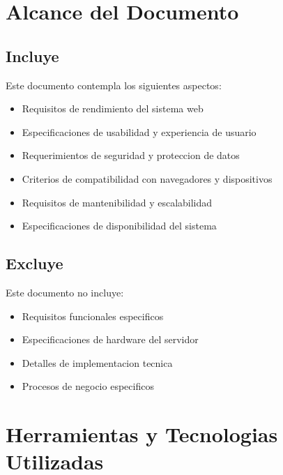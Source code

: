 \documentclass[12pt, a4paper]{article}
\begin{document}
\section{Alcance del Documento}

\subsection{Incluye}

\hspace{1.27cm}Este documento contempla los siguientes aspectos:

\begin{itemize}
    \item Requisitos de rendimiento del sistema web
    \item Especificaciones de usabilidad y experiencia de usuario
    \item Requerimientos de seguridad y proteccion de datos
    \item Criterios de compatibilidad con navegadores y dispositivos
    \item Requisitos de mantenibilidad y escalabilidad
    \item Especificaciones de disponibilidad del sistema
\end{itemize}

\subsection{Excluye}

\hspace{1.27cm}Este documento no incluye:

\begin{itemize}
    \item Requisitos funcionales especificos
    \item Especificaciones de hardware del servidor
    \item Detalles de implementacion tecnica
    \item Procesos de negocio especificos
\end{itemize}

\section{Herramientas y Tecnologias Utilizadas}
\end{document}
